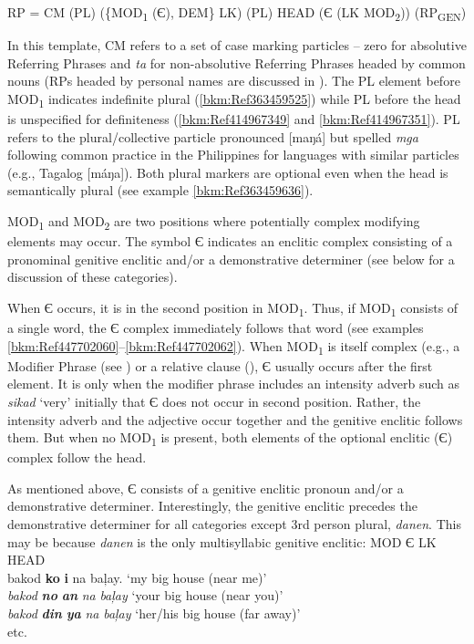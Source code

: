 \ea
\label{bkm:Ref340905081} \label{ex:rptemplate}
RP = CM (PL) (\{MOD\textsubscript{1} ({Є), DEM\} LK) (PL) HEAD (Є (LK MOD}\textsubscript{2})) (RP\textsubscript{GEN})
\z

In this template, CM refers to a set of case marking particles – zero for absolutive Referring Phrases and \textit{ta} for non-absolutive Referring Phrases headed by common nouns (RPs headed by personal names are discussed in ). The PL element before MOD\textsubscript{1} indicates indefinite plural (\ref{bkm:Ref363459525}) while PL before the head is unspecified\textsubscript{} for definiteness (\ref{bkm:Ref414967349} and \ref{bkm:Ref414967351}). PL refers to the plural/collective particle pronounced [maŋá] but spelled \textit{mga} following common practice in the Philippines for languages with similar particles (e.g., Tagalog [máŋa]). Both plural markers are optional even when the head is semantically plural (see example \ref{bkm:Ref363459636}).

MOD\textsubscript{1} and MOD\textsubscript{2} are two positions where potentially complex modifying elements may occur. The symbol {Є} indicates an enclitic complex consisting of a pronominal genitive enclitic and/or a demonstrative determiner (see below for a discussion of these categories). 

When Є occurs, it is in the second position in MOD\textsubscript{1}. Thus, if MOD\textsubscript{1} consists of a single word, the Є complex immediately follows that word (see examples \ref{bkm:Ref447702060}{}--\ref{bkm:Ref447702062}). When MOD\textsubscript{1} is itself complex (e.g., a Modifier Phrase (see ) or a relative clause (), Є usually occurs after the first element. It is only when the modifier phrase includes an intensity adverb such as \textit{sikad} ‘very’ initially that Є does not occur in second position. Rather, the  intensity adverb and the adjective occur together and the genitive enclitic follows them. But when no MOD\textsubscript{1} is present, both elements of the optional enclitic (Є) complex follow the head.

As mentioned above, Є consists of a genitive enclitic pronoun and/or a demonstrative determiner. Interestingly, the genitive enclitic precedes the demonstrative determiner for all categories except 3rd person plural, \textit{danen}. This may be because \textit{danen} is the only multisyllabic genitive enclitic: 
\ea
MOD \hspace{12pt} Є \hspace{8pt} LK  HEAD \\
\glll bakod \textbf{ko} \textbf{i} na baļay. \textnormal{‘my big  house (near me)’} \\
\textit{bakod} \textbf{\textit{no}} \textbf{\textit{an}} \textit{na} \textit{baļay} {‘your big house (near you)’}	 \\ 
\textit{bakod} \textbf{\textit{din}} \textbf{\textit{ya}} \textit{na} \textit{baļay}  {‘her/his big house (far away)’} \\
\glt etc.
\z

